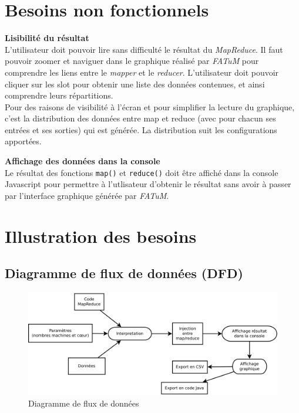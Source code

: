\documentclass[12pt,a4paper]{article}
\begin{document}
\section{Besoins non fonctionnels}



\textbf{Lisibilité du résultat\\} L'utilisateur doit pouvoir lire sans difficulté le résultat du \textit{MapReduce}. Il faut pouvoir zoomer et naviguer dans le graphique réalisé par \textit{FATuM} pour comprendre les liens entre le \textit{mapper} et le \textit{reducer}. L'utilisateur doit pouvoir cliquer sur les slot pour obtenir une liste des données contenues, et ainsi comprendre leurs répartitions.\\

Pour des raisons de visibilité à l'écran et pour simplifier la lecture du graphique, c'est la distribution des données entre map et reduce (avec pour chacun ses entrées et ses sorties) qui est générée. La distribution suit les configurations apportées.

\textbf{Affichage des données dans la console\\} Le résultat des fonctions \texttt{map()} et \texttt{reduce()} doit être affiché dans la console Javascript pour permettre à l'utlisateur d'obtenir le résultat sans avoir à passer par l'interface graphique générée par \textit{FATuM}.


\section{Illustration des besoins}
\subsection{Diagramme de flux de données (DFD)}

\begin{figure}[H]
  \centering
    \includegraphics[width=1\textwidth]{images/diagramme_de_flux_de_donnees.pdf}
	\caption{Diagramme de flux de données}
\end{figure}
\end{document}
